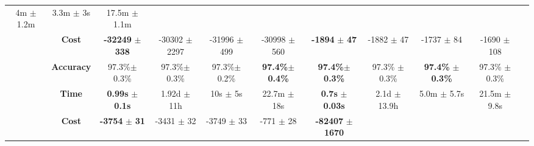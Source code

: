 {\begin{landscape}
\begin{table}[h]
\begin{latin}
\begin{tabular}{|c|c|c|c|c|c|c|c|c|c|c|}
		4m $\pm$ 1.2m &
		3.3m $\pm$ 3s &
		17.5m $\pm$ 1.1m \\
		&
		\textbf{Cost} & 
		\textbf{-32249} $\pm$ \textbf{338} & 
		-30302 $\pm$ 2297 & 
		-31996 $\pm$ 499 & 
		-30998 $\pm$ 560& 
		\textbf{-1894} $\pm$ \textbf{47} & 
		-1882 $\pm$ 47 & 
		-1737 $\pm$ 84 & 
		-1690 $\pm$ 108 \\                  
		&
		\textbf{Accuracy} & 
		97.3\%$\pm$ 0.3\% & 
		97.3\%$\pm$ 0.3\% & 
		97.3\%$\pm$ 0.2\% & 
		\textbf{97.4\%}$\pm$ \textbf{0.4\%} & 
		\textbf{97.4\%}$\pm$ \textbf{0.3\%} & 
		97.3\% $\pm$ 0.3\% & 
		\textbf{97.4\%} $\pm$ \textbf{0.3\%} & 
		97.3\% $\pm$ 0.3\% \\
		\hline
		\parbox[t]{1mm}{}&
		\textbf{Time} & 
		\textbf{0.99s} $\pm$ \textbf{0.1s} & 
		1.92d $\pm$ 11h & 
		10s $\pm$ 5s & 
		22.7m $\pm$ 18s & 
		\textbf{0.7s} $\pm$ \textbf{0.03s} & 
		2.1d $\pm$ 13.9h &
		5.0m $\pm$ 5.7s &
		21.5m $\pm$ 9.8s\\
		&
		\textbf{Cost} & 
		\textbf{-3754} $\pm$ \textbf{31} & 
		-3431 $\pm$ 32 & 
		-3749 $\pm$ 33 & 
		-771 $\pm$ 28 & 
		\textbf{-82407} $\pm$ \textbf{1670} & 

\end{tabular}
\end{latin}
\end{table}
\end{landscape}}
